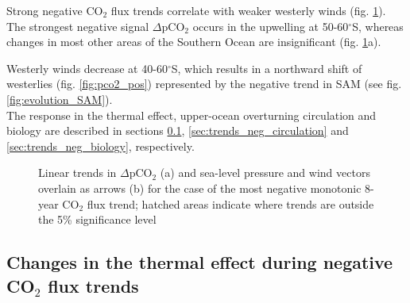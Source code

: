 Strong negative CO$_2$ flux trends correlate with weaker westerly winds (fig. \ref{fig:pco2_neg}). The strongest negative signal $\Delta$pCO$_2$ occurs in the upwelling at 50-60$^\circ$S, whereas changes in most other areas of the Southern Ocean are insignificant (fig. \ref{fig:pco2_neg}a). 

Westerly winds decrease at 40-60$^\circ$S, which results in a northward shift of westerlies (fig. \ref{fig:pco2_pos}) represented by the negative trend in \acs{SAM} (see fig. \ref{fig:evolution_SAM}).
\\

The response in the thermal effect, upper-ocean overturning circulation and biology are described in sections \ref{sec:trends_neg_thermal}, \ref{sec:trends_neg_circulation} and \ref{sec:trends_neg_biology}, respectively.


\begin{figure}[h!]
\centering
	\caption{Linear trends in $\Delta$pCO$_2$ (a) and sea-level pressure and wind vectors overlain as arrows (b) for the case of the most negative monotonic 8-year CO$_2$ flux trend; hatched areas indicate where trends are outside the 5\% significance level}
	\label{fig:pco2_neg}
\end{figure}

\clearpage

\subsection{Changes in the thermal effect during negative CO$_2$ flux trends}
\label{sec:trends_neg_thermal}

